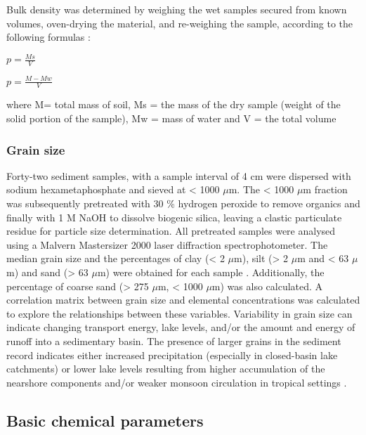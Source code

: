 \documentclass[
  12pt,
]{book}
\begin{document}
Bulk density was determined by weighing the wet samples secured from known volumes, oven-drying the material, and re-weighing the sample, according to the following formulas \citep{taylorProceedingsOceanDrilling1992}:

\(p = \frac{Ms}{V}\)

\(p = \frac{M-Mw}{V}\)

where M= total mass of soil, Ms = the mass of the dry sample (weight of the solid portion of the sample), Mw = mass of water and V = the total volume

\hypertarget{grains}{%
\subsubsection{Grain size}\label{grains}}

Forty-two sediment samples, with a sample interval of 4 cm were dispersed with sodium hexametaphosphate and sieved at \textless{} 1000 \(\mu\)m. The \textless{} 1000 \(\mu\)m fraction was subsequently pretreated with 30 \% hydrogen peroxide to remove organics and finally with 1 M NaOH to dissolve biogenic silica, leaving a clastic particulate residue for particle size determination. All pretreated samples were analysed using a Malvern Mastersizer 2000 laser diffraction spectrophotometer. The median grain size and the percentages of clay (\textless{} 2 \(\mu\)m), silt (\textgreater{} 2 \(\mu\)m and \textless{} 63 \(\mu\)m) and sand (\textgreater{} 63 \(\mu\)m) were obtained for each sample \citep{geeParticlesizeAnalysis1986}. Additionally, the percentage of coarse sand (\textgreater{} 275 \(\mu\)m, \textless{} 1000 \(\mu\)m) was also calculated. A correlation matrix between grain size and elemental concentrations was calculated to explore the relationships between these variables. Variability in grain size can indicate changing transport energy, lake levels, and/or the amount and energy of runoff into a sedimentary basin. The presence of larger grains in the sediment record indicates either increased precipitation (especially in closed-basin lake catchments) \citep{chenEnvironmentalRecordsLacustrine2004, conroyHoloceneChangesEastern2008} or lower lake levels resulting from higher accumulation of the nearshore components and/or weaker monsoon circulation in tropical settings \citep{xiaoHoloceneWeakMonsoon2009}.

\hypertarget{basic-chemical-parameters}{%
\subsection{Basic chemical parameters}\label{basic-chemical-parameters}}
\end{document}
